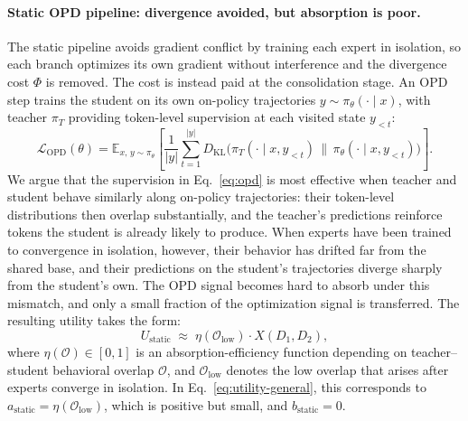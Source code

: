 \documentclass{llmxive}
\begin{document}
\paragraph{Static OPD pipeline: divergence avoided, but absorption is poor.}
The static pipeline avoids gradient conflict by training each expert in isolation, so each branch optimizes its own gradient without interference and the divergence cost $\Phi$ is removed. The cost is instead paid at the consolidation stage. An OPD step trains the student on its own on-policy trajectories $y \sim \pi_\theta(\cdot \mid x)$, with teacher $\pi_T$ providing token-level supervision at each visited state $y_{<t}$:
\begin{equation}
\mathcal{L}_{\text{OPD}}(\theta) = \mathbb{E}_{x, \, y \sim \pi_\theta} \left[ \frac{1}{|y|} \sum_{t=1}^{|y|} D_{\mathrm{KL}}\big(\pi_T(\cdot \mid x, y_{<t}) \,\|\, \pi_\theta(\cdot \mid x, y_{<t})\big) \right].
\label{eq:opd}
\end{equation}
We argue that the supervision in Eq.~\eqref{eq:opd} is most effective when teacher and student behave similarly along on-policy trajectories: their token-level distributions then overlap substantially, and the teacher's predictions reinforce tokens the student is already likely to produce. When experts have been trained to convergence in isolation, however, their behavior has drifted far from the shared base, and their predictions on the student's trajectories diverge sharply from the student's own. The OPD signal becomes hard to absorb under this mismatch, and only a small fraction of the optimization signal is transferred. The resulting utility takes the form:
\begin{equation}
U_{\text{static}} \;\approx\; \eta(\mathcal{O}_{\text{low}}) \cdot X(D_1, D_2),
\label{eq:utility-static}
\end{equation}
where $\eta(\mathcal{O}) \in [0, 1]$ is an absorption-efficiency function depending on teacher--student behavioral overlap $\mathcal{O}$, and $\mathcal{O}_{\text{low}}$ denotes the low overlap that arises after experts converge in isolation. In Eq.~\eqref{eq:utility-general}, this corresponds to $a_{\text{static}} = \eta(\mathcal{O}_{\text{low}})$, which is positive but small, and $b_{\text{static}} = 0$.
\end{document}
